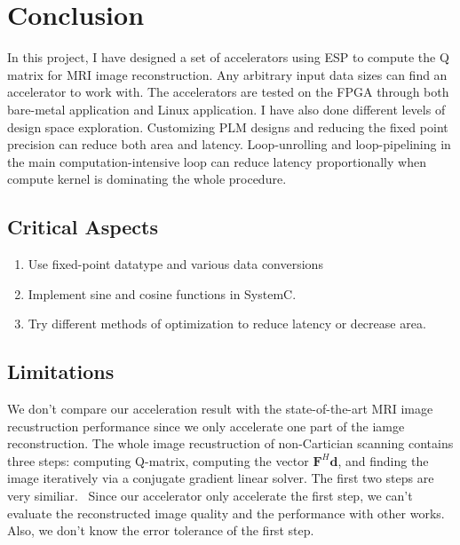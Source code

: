\section{Conclusion}

In this project, I have designed a set of accelerators using ESP to compute the
Q matrix for MRI image reconstruction. Any arbitrary input data sizes can find
an accelerator to work with. The accelerators are tested on the FPGA through
both bare-metal application and Linux application. I have also done different
levels of design space exploration. Customizing PLM designs and reducing the
fixed point precision can reduce both area and latency. Loop-unrolling and
loop-pipelining in the main computation-intensive loop can reduce latency
proportionally when compute kernel is dominating the whole procedure.


\subsection{Critical Aspects}

\begin{enumerate}

\item Use fixed-point datatype and various data conversions

\item Implement sine and cosine functions in SystemC.

\item Try different methods of optimization to reduce latency or decrease area.

\end{enumerate}

\subsection{Limitations}

We don't compare our acceleration result with the state-of-the-art MRI image
recustruction performance since we only accelerate one part of the iamge
reconstruction. The whole image recustruction of non-Cartician scanning contains
three steps: computing Q-matrix, computing the vector $\mathbf{F}^{H}
\mathbf{d}$, and finding the image iteratively via a conjugate gradient linear
solver. The first two steps are very similiar.~\cite{stone2008accelerating}
Since our accelerator only accelerate the first step, we can't evaluate the
reconstructed image quality and the performance with other works. Also, we don't
know the error tolerance of the first step.

